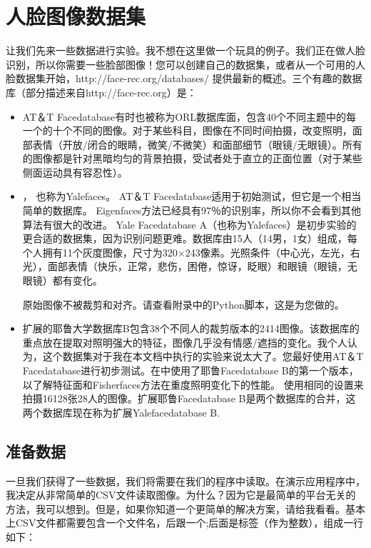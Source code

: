 \documentclass[UTF8]{ctexart}
\begin{document}
\section{人脸图像数据集}
让我们先来一些数据进行实验。我不想在这里做一个玩具的例子。我们正在做人脸识别，所以你需要一些脸部图像！您可以创建自己的数据集，或者从一个可用的人脸数据集开始，http://face-rec.org/databases/ 提供最新的概述。三个有趣的数据库（部分描述来自http://face-rec.org）是：
\begin{itemize}
    	\item {\color{blue}{AT＆T Facedatabase}} \; AT＆T Facedatabase有时也被称为ORL数据库面，包含40个不同主题中的每一个的十个不同的图像。对于某些科目，图像在不同时间拍摄，改变照明，面部表情（开放/闭合的眼睛，微笑/不微笑）和面部细节（眼镜/无眼镜）。所有的图像都是针对黑暗均匀的背景拍摄，受试者处于直立的正面位置（对于某些侧面运动具有容忍性）。
    	\item {\color{blue}{Yale Facedatabase A}} ，\; 也称为Yalefaces。 AT＆T Facedatabase适用于初始测试，但它是一个相当简单的数据库。 Eigenfaces方法已经具有97％的识别率，所以你不会看到其他算法有很大的改进。 Yale Facedatabase A（也称为Yalefaces）是初步实验的更合适的数据集，因为识别问题更难。数据库由15人（14男，1女）组成，每个人拥有11个灰度图像，尺寸为320×243像素。光照条件（中心光，左光，右光），面部表情（快乐，正常，悲伤，困倦，惊讶，眨眼）和眼镜（眼镜，无眼镜）都有变化。

    原始图像不被裁剪和对齐。请查看附录中的Python脚本，这是为您做的。

    	\item {\color{blue}{Extended Yale Facedatabase B }} \; 扩展的耶鲁大学数据库B包含38个不同人的裁剪版本的2414图像。该数据库的重点放在提取对照明强大的特征，图像几乎没有情感/遮挡的变化。我个人认为，这个数据集对于我在本文档中执行的实验来说太大了。您最好使用AT＆T Facedatabase进行初步测试。在\cite{Belhumeur1997}中使用了耶鲁Facedatabase B的第一个版本，以了解特征面和Fisherfaces方法在重度照明变化下的性能。 \cite{Lee2005}使用相同的设置来拍摄16128张28人的图像。扩展耶鲁Facedatabase B是两个数据库的合并，这两个数据库现在称为扩展Yalefacedatabase B.
\end{itemize}

\subsection{准备数据}
一旦我们获得了一些数据，我们将需要在我们的程序中读取。在演示应用程序中，我决定从非常简单的CSV文件读取图像。为什么？因为它是最简单的平台无关的方法，我可以想到。但是，如果你知道一个更简单的解决方案，请给我看看。基本上CSV文件都需要包含一个文件名，后跟一个;后面是标签（作为整数），组成一行如下：
\end{document}
